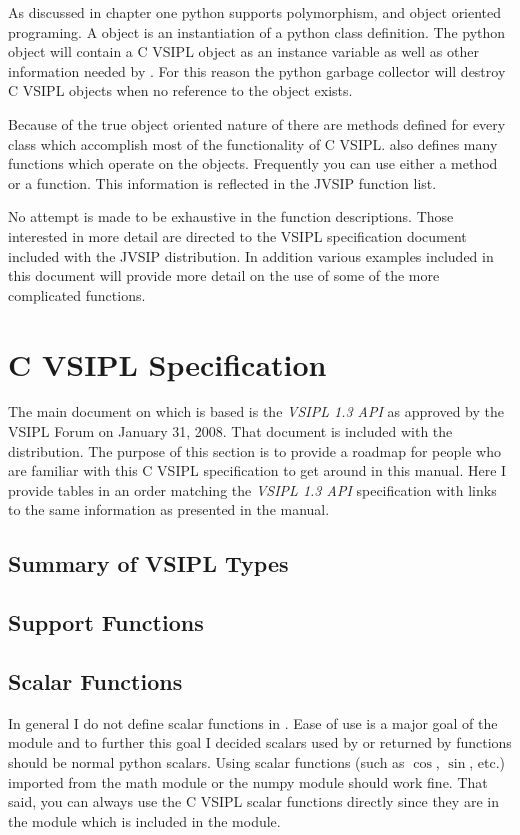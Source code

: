 As discussed in chapter one python supports polymorphism, and object oriented programing. A \pyjv object is an instantiation of a python class definition. The python object will contain a C VSIPL object as an instance variable as well as other information needed by \pyjv. For this reason the python garbage collector will destroy C VSIPL objects when no reference to the \pyjv object exists.

Because of the true object oriented nature of \pyjv there are methods defined for every class which accomplish most of the functionality of C VSIPL.  also defines many functions which operate on the \pyjv objects. Frequently you can use either a method or a function. This information is reflected in the JVSIP function list.

No attempt is made to be exhaustive in the function descriptions. Those interested in more detail are directed to the VSIPL specification document included with the JVSIP distribution. In addition various examples included in this document will provide more detail on the use of some of the more complicated functions.

\section*{C VSIPL Specification}
The main document on which  is based is the \emph{VSIPL 1.3 API} as approved by the VSIPL Forum on January 31, 2008.  That document is included with the  distribution.  The purpose of this section is to provide a roadmap for people who are familiar with this C VSIPL specification to get around in this  manual.  Here I provide tables in an order matching the \emph{VSIPL 1.3 API} specification with links to the same information as presented  in the  manual.
    
\subsection*{Summary of VSIPL Types}
\subsection*{Support Functions}
    
\subsection*{Scalar Functions}
In general I do not define scalar functions in \pyjv.  Ease of use is a major goal of the \pyjv module and to further this goal I decided scalars used by or returned by \pyjv functions should be normal python scalars. Using scalar functions (such as $\cos$, $\sin$, etc.) imported from the math module or the numpy module should work fine. That said, you can always use the C VSIPL scalar functions directly since they are in the  module which is included in the \pyjv module.
